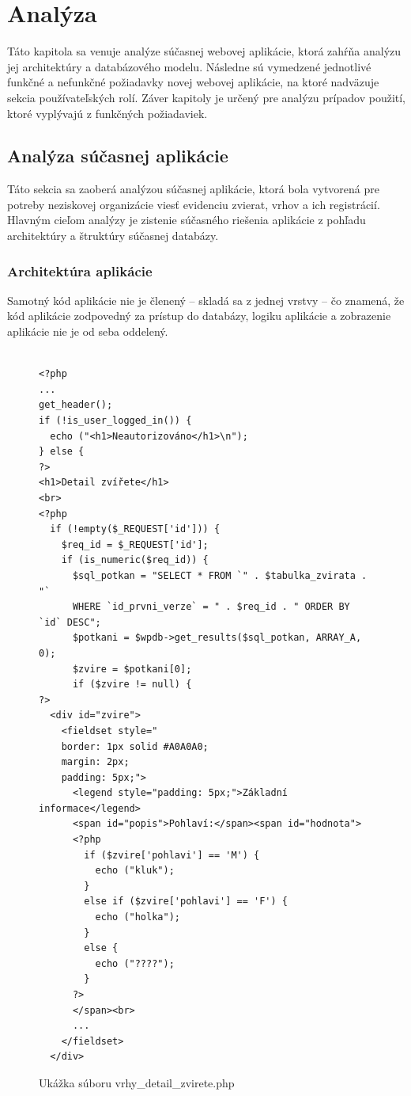 \chapter{Analýza}
Táto kapitola sa venuje analýze súčasnej webovej aplikácie, ktorá zahŕňa analýzu jej architektúry a databázového modelu. Následne sú vymedzené jednotlivé funkčné a nefunkčné požiadavky novej webovej aplikácie, na ktoré nadväzuje sekcia používateľských rolí. Záver kapitoly je určený pre analýzu prípadov použití, ktoré vyplývajú z funkčných požiadaviek.

\section{Analýza súčasnej aplikácie}
Táto sekcia sa zaoberá analýzou súčasnej aplikácie, ktorá bola vytvorená pre potreby neziskovej organizácie viesť evidenciu zvierat, vrhov a ich registrácií.
Hlavným cieľom analýzy je zistenie súčasného riešenia aplikácie z pohľadu architektúry a štruktúry súčasnej databázy.

\subsection{Architektúra aplikácie}
Samotný kód aplikácie nie je členený -- skladá sa z jednej vrstvy -- čo znamená, že kód aplikácie zodpovedný za prístup do databázy, logiku aplikácie a zobrazenie aplikácie nie je od seba oddelený.

\begin{figure}[H]
\begin{minipage}[]{\linewidth}
\begin{verbatim}

<?php
...
get_header();
if (!is_user_logged_in()) { 
  echo ("<h1>Neautorizováno</h1>\n");
} else {
?>
<h1>Detail zvířete</h1>
<br>
<?php
  if (!empty($_REQUEST['id'])) {
    $req_id = $_REQUEST['id'];
    if (is_numeric($req_id)) {
      $sql_potkan = "SELECT * FROM `" . $tabulka_zvirata . "`
      WHERE `id_prvni_verze` = " . $req_id . " ORDER BY `id` DESC";
      $potkani = $wpdb->get_results($sql_potkan, ARRAY_A, 0);
      $zvire = $potkani[0];
      if ($zvire != null) {
?>
  <div id="zvire">
    <fieldset style="
    border: 1px solid #A0A0A0;
    margin: 2px;
    padding: 5px;">
      <legend style="padding: 5px;">Základní informace</legend>
      <span id="popis">Pohlaví:</span><span id="hodnota">
      <?php 
        if ($zvire['pohlavi'] == 'M') {
          echo ("kluk"); 
        }
        else if ($zvire['pohlavi'] == 'F') {
          echo ("holka"); 
        }
        else {
          echo ("????"); 
        }
      ?>
      </span><br>
      ...
    </fieldset>
  </div>
\end{verbatim}
\end{minipage}

\caption[Ukážka súboru vrhy\_detail\_zvirete.php]
{Ukážka súboru vrhy\_detail\_zvirete.php}
\label{current-code-example}
\end{figure}

